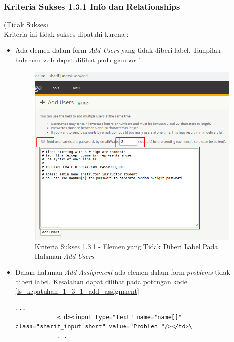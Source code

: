 \documentclass[a4paper,twoside]{article}
\begin{document}
\begin{enumerate}
		\subsubsection*{Kriteria Sukses 1.3.1 Info dan Relationships}
		\label{subsubsec:kepatuhan_kriteria_1.3.1}
		(Tidak Sukses) \\
		Kriteria ini tidak sukses dipatuhi karena :
		\begin{itemize}
			\item Ada elemen dalam form \textit{Add Users} yang tidak diberi label. Tampilan halaman web dapat dilihat pada gambar \ref{fig:kepatuhan_1_3_1_add_user}.
			\begin{figure}[H]
				\centering  
				\includegraphics[scale=0.3]{kepatuhan_1_3_1_add_user}  
				\caption[Kriteria Sukses 1.3.1 - Elemen yang Tidak Diberi Label Pada Halaman \textit{Add Users}]{Kriteria Sukses 1.3.1 - Elemen yang Tidak Diberi Label Pada Halaman \textit{Add Users}} 
				\label{fig:kepatuhan_1_3_1_add_user} 
			\end{figure}
			\item Dalam halaman \textit{Add Assignment} ada elemen dalam form \textit{problems} tidak diberi label. Kesalahan dapat dilihat pada potongan kode \ref{ls_kepatuhan_1_3_1_add_assignment}.
			\begin{lstlisting}[basicstyle=\ttfamily, frame=single,
			columns=fullflexible, keepspaces=true, breaklines=true, label=ls_kepatuhan_1_3_1_add_assignment, caption=Kriteria Sukses 1.3.1 - Elemen Dalam Form yang Tidak Diberi Label]
			...
			<td><input type="text" name="name[]" class="sharif_input short" value="Problem "/></td>\
			...
			\end{lstlisting}
			

\end{itemize}
\end{enumerate}
\end{document}
